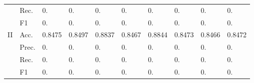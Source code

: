 \begin{tabular}{clllllllll}
                                      & Rec.                                                 & 0.                      & 0.                      & 0.                           & 0.                      & 0.                                                                           & 0.                                                                          & 0.                                        & 0.                                        \\
                                      & F1                                                   & 0.                      & 0.                      & 0.                           & 0.                      & 0.                                                                           & 0.                                                                          & 0.                                        & 0.                                        \\ 
    \midrule
    \multirow{4}{*}{II}               & Acc.                                                 & 0.8475                  & 0.8497                  & 0.8837                       & 0.8467                  & 0.8844                                                                       & 0.8473                                                                      & 0.8466                                    & 0.8472                                    \\
                                      & Prec.                                                & 0.                      & 0.                      & 0.                           & 0.                      & 0.                                                                           & 0.                                                                          & 0.                                        & 0.                                        \\
                                      & Rec.                                                 & 0.                      & 0.                      & 0.                           & 0.                      & 0.                                                                           & 0.                                                                          & 0.                                        & 0.                                        \\
                                      & F1                                                   & 0.                      & 0.                      & 0.                           & 0.                      & 0.                                                                           & 0.                                                                          & 0.                                        & 0.                                        \\ 

\end{tabular}
